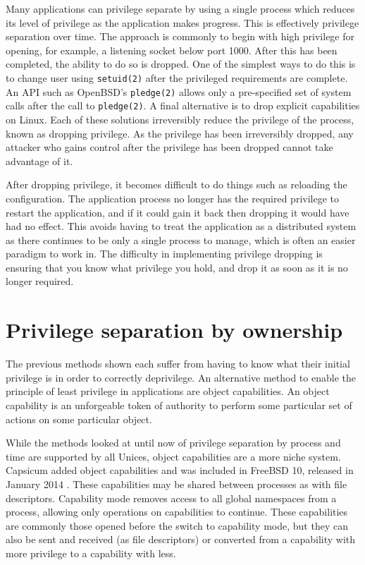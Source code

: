 \documentclass[12pt,a4paper,twoside]{report}
\begin{document}
Many applications can privilege separate by using a single process which reduces its level of privilege as the application makes progress. This is effectively privilege separation over time. The approach is commonly to begin with high privilege for opening, for example, a listening socket below port 1000. After this has been completed, the ability to do so is dropped. One of the simplest ways to do this is to change user using \texttt{setuid(2)} after the privileged requirements are complete. An API such as OpenBSD's \texttt{pledge(2)} allows only a pre-specified set of system calls after the call to \texttt{pledge(2)}. A final alternative is to drop explicit capabilities on Linux. Each of these solutions irreversibly reduce the privilege of the process, known as dropping privilege. As the privilege has been irreversibly dropped, any attacker who gains control after the privilege has been dropped cannot take advantage of it.

After dropping privilege, it becomes difficult to do things such as reloading the configuration. The application process no longer has the required privilege to restart the application, and if it could gain it back then dropping it would have had no effect. This avoids having to treat the application as a distributed system as there continues to be only a single process to manage, which is often an easier paradigm to work in. The difficulty in implementing privilege dropping is ensuring that you know what privilege you hold, and drop it as soon as it is no longer required.

\section{Privilege separation by ownership}
\label{sec:priv-sep-ownership}

The previous methods shown each suffer from having to know what their initial privilege is in order to correctly deprivilege. An alternative method to enable the principle of least privilege in applications are object capabilities. An object capability is an unforgeable token of authority to perform some particular set of actions on some particular object.

While the methods looked at until now of privilege separation by process and time are supported by all Unices, object capabilities are a more niche system. Capsicum added object capabilities and was included in FreeBSD 10, released in January 2014 \citep{watson_capsicum_2010}. These capabilities may be shared between processes as with file descriptors. Capability mode removes access to all global namespaces from a process, allowing only operations on capabilities to continue. These capabilities are commonly those opened before the switch to capability mode, but they can also be sent and received (as file descriptors) or converted from a capability with more privilege to a capability with less.
\end{document}
